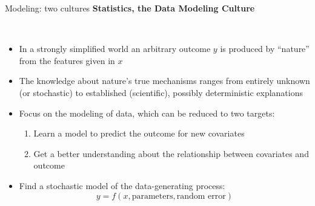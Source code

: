 \documentclass[11pt,compress,t,notes=noshow, xcolor=table]{beamer}
\begin{document}
\begin{vbframe}{Modeling: two cultures}
\textbf{Statistics, the Data Modeling Culture}
\begin{center}
\vspace{1cm}
   \\
\vspace{1cm}
\begin{itemize}
  \item In a strongly simplified world an arbitrary outcome $y$ is produced by \enquote{nature} from the features given in $x$
  \item The knowledge about nature's true mechanisms ranges from entirely unknown (or stochastic) to established (scientific), possibly deterministic explanations
\end{itemize}
\end{center}

\framebreak

\begin{itemize}
  \item Focus on the modeling of data, which can be reduced to two targets:
  \begin{enumerate}
    \item Learn a model to predict the outcome for new covariates
    \item Get a better understanding about the relationship between covariates and outcome
  \end{enumerate}
\end{itemize}
\begin{center}
  \end{center}
\begin{itemize}
  \item Find a stochastic model of the data-generating process:
  $$y = f(x, \text{parameters}, \text{random error})$$
\end{itemize}


\end{vbframe}
\end{document}
